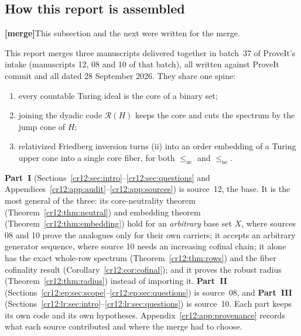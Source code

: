 \documentclass[11pt,letterpaper]{article}
\theoremstyle{plain}
\theoremstyle{definition}
\theoremstyle{remark}
\numberwithin{equation}{section}
\newcommand{\leuc}{\leq_{\mathrm{uc}}}
\newcommand{\lenc}{\leq_{\mathrm{nc}}}
\newcommand{\Rcode}{\mathcal R}
\newcommand{\mergenote}[1]{\par\smallskip\noindent
 {\small\textsf{\textbf{[merge]}}\enspace #1}\par\smallskip}
\begin{document}
\subsection{How this report is assembled}\label{cr12:sec:assembly}
\mergenote{This subsection and the next were written for the merge.}
This report merges three manuscripts delivered together in batch~37 of
ProveIt's intake (manuscripts 12, 08 and 10 of that batch), all written against
ProveIt commit  and all dated
28 September 2026. They share one spine:
\begin{enumerate}[label=(\roman*)]
\item every countable Turing ideal is the core of a binary set;
\item joining the dyadic code $\Rcode(H)$ keeps the core and cuts the spectrum
 by the jump cone of $H$;
\item relativized Friedberg inversion turns (ii) into an order embedding of a
 Turing upper cone into a single core fiber, for both $\leuc$ and $\lenc$.
\end{enumerate}
\textbf{Part~I} (Sections~\ref{cr12:sec:intro}--\ref{cr12:sec:questions} and
Appendices~\ref{cr12:app:audit}--\ref{cr12:app:sources}) is source~12, the base.
It is the most general of the three: its core-neutrality theorem
(Theorem~\ref{cr12:thm:neutral}) and embedding theorem
(Theorem~\ref{cr12:thm:embedding}) hold for an \emph{arbitrary} base set $X$, where
sources 08 and 10 prove the analogues only for their own carriers; it accepts an
arbitrary generator sequence, where source 10 needs an increasing cofinal chain;
it alone has the exact whole-row spectrum (Theorem~\ref{cr12:thm:rows}) and the
fiber cofinality result (Corollary~\ref{cr12:cor:cofinal}); and it proves the robust
radius (Theorem~\ref{cr12:thm:radius}) instead of importing it.
\textbf{Part~II} (Sections~\ref{cr12:ep:sec:scope}--\ref{cr12:ep:sec:questions}) is
source~08, and \textbf{Part~III}
(Sections~\ref{cr12:lr:sec:intro}--\ref{cr12:lr:sec:questions}) is source~10. Each
part keeps its own code and its own hypotheses. Appendix~\ref{cr12:app:provenance}
records what each source contributed and where the merge had to choose.
\end{document}
